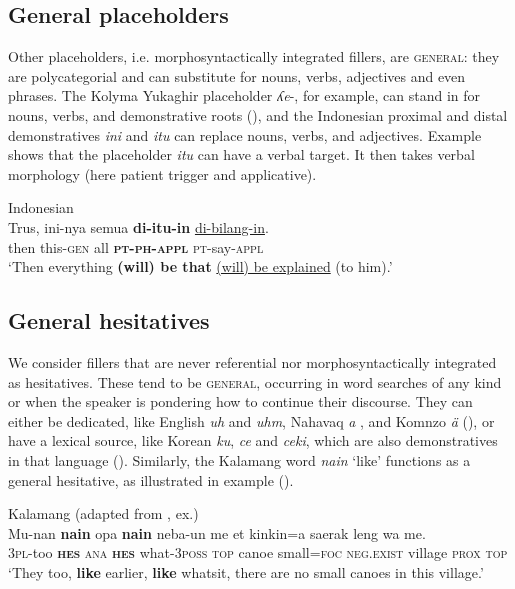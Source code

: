 \documentclass[output=paper]{langscibook}
\begin{document}
\subsection{General placeholders}\label{sec:intro:4.2}

Other placeholders, i.e. morphosyntactically integrated fillers, are \textsc{general}: they are polycategorial and can substitute for nouns, verbs, adjectives and even phrases. The Kolyma Yukaghir placeholder \textit{ʎe}-, for example, can stand in for nouns, verbs, and demonstrative roots (\citealt{chapters/ventayol_boada}), and the Indonesian proximal and distal demonstratives \textit{ini} and \textit{itu} \citep{Wouk2005} can replace nouns, verbs, and adjectives. Example  shows that the placeholder \textit{itu} can have a verbal target. It then takes verbal morphology (here patient trigger and applicative). 

\ea \label{ex:intro:5}
{Indonesian \citep[242]{Wouk2005}} \\
\gll Trus, ini-nya semua \textbf{di-itu-in} \uline{di-bilang-in}.\\
     then this-\textsc{gen} all \textbf{\textsc{pt-ph-appl}} \textsc{pt}-say-\textsc{appl}\\
\glt ‘Then everything \textbf{(will) be that} \uline{(will) be explained} (to him).’
\z

\subsection{General hesitatives}\label{sec:intro:4.3}

We consider fillers that are never referential nor morphosyntactically integrated as hesitatives. These tend to be \textsc{general}, occurring in word searches of any kind or when the speaker is pondering how to continue their discourse. They can either be dedicated, like English \textit{uh} and \textit{uhm}, Nahavaq \textit{a} \citep{Dimock2010}, and Komnzo \textit{ä} (\citealt{chapters/doehler}), or have a lexical source, like Korean \textit{ku}, \textit{ce} and \textit{ceki}, which are also demonstratives in that language (\citealt{Hayashi2006}). Similarly, the Kalamang word \textit{nain} ‘like’ functions as a general hesitative, as illustrated in example  (\citealt{chapters/visser}).

\ea \label{ex:intro:6}
{Kalamang (adapted from \citealt[\pageref{exe:munan}]{chapters/visser}, ex.)}\\
\gll Mu-nan \textbf{nain} opa \textbf{nain} neba-un me et kinkin=a saerak leng wa me.\\
     3\textsc{pl}{}-too \textbf{\textsc{hes}} \textsc{ana} \textbf{\textsc{hes}} what-\textsc{3poss} \textsc{top} canoe small=\textsc{foc} \textsc{neg.exist} village \textsc{prox} \textsc{top}\\
\glt ‘They too, \textbf{like} earlier, \textbf{like} whatsit, there are no small canoes in this village.’
\z
\end{document}
